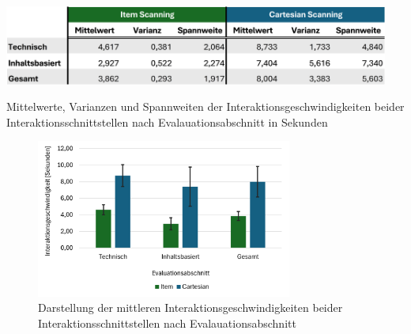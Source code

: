 \begin{table}[tbh]
    \centering
    \includegraphics[width=0.95\textwidth]{images/Results/Interaktionsgeschwindigkeiten-Table.png}
    \caption{Mittelwerte, Varianzen und Spannweiten der Interaktionsgeschwindigkeiten beider Interaktionsschnittstellen nach Evalauationsabschnitt in Sekunden}
    \label{tab:InteraktionsgeschwindigkeitenTable}
\end{table}

\begin{figure}[tbh]
    \centering
    \includegraphics[width=0.75\textwidth]{images/Results/Interaktionsgeschwindigkeiten.png}
    \caption{Darstellung der mittleren Interaktionsgeschwindigkeiten beider Interaktionsschnittstellen nach Evalauationsabschnitt}
    \label{fig:Interaktionsgeschwindigkeiten}
\end{figure}

